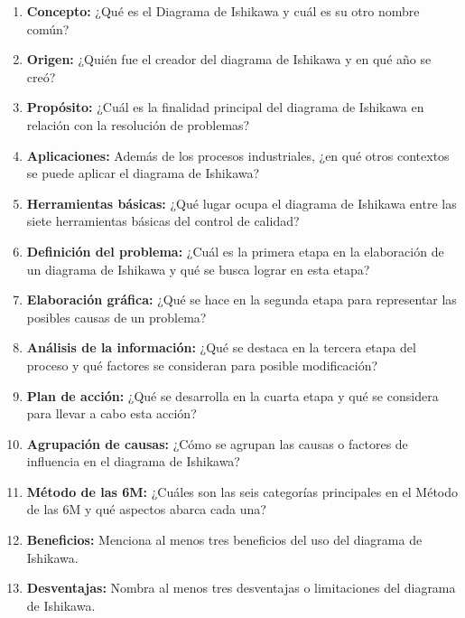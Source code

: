 \documentclass[../main]{subfiles}
\begin{document}
\begin{enumerate}
  \item \textbf{Concepto:} ¿Qué es el Diagrama de Ishikawa y cuál es
    su otro nombre común?
  \item \textbf{Origen:} ¿Quién fue el creador del diagrama de
    Ishikawa y en qué año se creó?
  \item \textbf{Propósito:} ¿Cuál es la finalidad principal del
    diagrama de Ishikawa en relación con la resolución de problemas?
  \item \textbf{Aplicaciones:} Además de los procesos industriales,
    ¿en qué otros contextos se puede aplicar el diagrama de Ishikawa?
  \item \textbf{Herramientas básicas:} ¿Qué lugar ocupa el diagrama
    de Ishikawa entre las siete herramientas básicas del control de calidad?
  \item \textbf{Definición del problema:} ¿Cuál es la primera etapa
    en la elaboración de un diagrama de Ishikawa y qué se busca
    lograr en esta etapa?
  \item \textbf{Elaboración gráfica:} ¿Qué se hace en la segunda
    etapa para representar las posibles causas de un problema?
  \item \textbf{Análisis de la información:} ¿Qué se destaca en la
    tercera etapa del proceso y qué factores se consideran para
    posible modificación?
  \item \textbf{Plan de acción:} ¿Qué se desarrolla en la cuarta
    etapa y qué se considera para llevar a cabo esta acción?
  \item \textbf{Agrupación de causas:} ¿Cómo se agrupan las causas o
    factores de influencia en el diagrama de Ishikawa?
  \item \textbf{Método de las 6M:} ¿Cuáles son las seis categorías
    principales en el Método de las 6M y qué aspectos abarca cada una?
  \item \textbf{Beneficios:} Menciona al menos tres beneficios del
    uso del diagrama de Ishikawa.
  \item \textbf{Desventajas:} Nombra al menos tres desventajas o
    limitaciones del diagrama de Ishikawa.
\end{enumerate}
\end{document}
